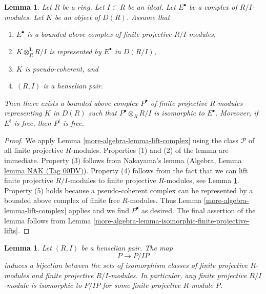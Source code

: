 \documentclass{amsart}
\theoremstyle{plain}
\newtheorem{lemma}[subsection]{Lemma}
\theoremstyle{definition}
\theoremstyle{remark}
\numberwithin{equation}{subsection}
\begin{document}
\begin{lemma}
\label{more-algebra-lemma-lift-complex-finite-projectives}
Let $R$ be a ring. Let $I \subset R$ be an ideal. Let $E^\bullet$
be a complex of $R/I$-modules. Let $K$ be an object of $D(R)$. Assume that
\begin{enumerate}
\item $E^\bullet$ is a bounded above complex of finite projective $R/I$-modules,
\item $K \otimes_R^\mathbf{L} R/I$ is represented by $E^\bullet$ in $D(R/I)$,
\item $K$ is pseudo-coherent, and
\item $(R, I)$ is a henselian pair.
\end{enumerate}
Then there exists a bounded above complex $P^\bullet$ of finite projective
$R$-modules representing $K$ in $D(R)$ such that $P^\bullet \otimes_R R/I$
is isomorphic to $E^\bullet$. Moreover, if $E^i$ is free, then $P^i$ is free.
\end{lemma}

\begin{proof}
We apply Lemma \ref{more-algebra-lemma-lift-complex} using the class $\mathcal{P}$
of all finite projective $R$-modules. Properties (1) and (2)
of the lemma are immediate.
Property (3) follows from Nakayama's lemma
(Algebra, Lemma \href{https://stacks.math.columbia.edu/tag/00DV}{lemma NAK (Tag 00DV)}).
Property (4) follows from the fact that we can lift finite projective
$R/I$-modules to finite projective $R$-modules, see
Lemma \ref{more-algebra-lemma-lift-finite-projective-module}.
Property (5) holds because a pseudo-coherent complex can be represented
by a bounded above complex of finite free $R$-modules.
Thus Lemma \ref{more-algebra-lemma-lift-complex} applies and we find $P^\bullet$
as desired. The final assertion of the lemma follows from
Lemma \ref{more-algebra-lemma-isomorphic-finite-projective-lifts}.
\end{proof}


\begin{lemma}
\label{more-algebra-lemma-lift-finite-projective-module}
Let $(R, I)$ be a henselian pair. The map
$$
P \longrightarrow P/IP
$$
induces a bijection between the sets of isomorphism classes of finite
projective $R$-modules and finite projective $R/I$-modules. In particular,
any finite projective $R/I$-module is isomorphic to $P/IP$
for some finite projective $R$-module $P$.
\end{lemma}
\end{document}
